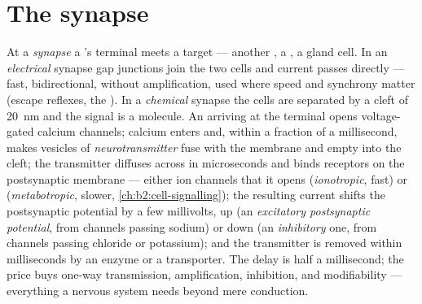 \section{The synapse}

\begin{definition}\label{def:b2:neurons-synapses:synapse}
At a \emph{synapse} a 's terminal meets a target --- another
, a , a gland cell. In an \emph{electrical}
synapse gap junctions join the two cells and current passes directly
--- fast, bidirectional, without amplification, used where speed and
synchrony matter (escape reflexes, the ). In a \emph{chemical}
synapse the cells are separated by a cleft of \qty{20}{nm} and the
signal is a molecule. An  arriving at the terminal
opens voltage-gated calcium channels; calcium enters and, within a
fraction of a millisecond, makes vesicles of \emph{neurotransmitter}
fuse with the membrane and empty into the cleft; the transmitter
diffuses across in microseconds and binds receptors on the
postsynaptic membrane --- either ion channels that it opens
(\emph{ionotropic}, fast) or 
(\emph{metabotropic}, slower, \cref{ch:b2:cell-signalling}); the
resulting current shifts the postsynaptic potential by a few
millivolts, up (an \emph{excitatory postsynaptic potential}, from
channels passing sodium) or down (an \emph{inhibitory} one, from
channels passing chloride or potassium); and the transmitter is
removed within milliseconds by an enzyme or a transporter. The
delay is half a millisecond; the price buys one-way transmission,
amplification, inhibition, and modifiability --- everything a
nervous system needs beyond mere conduction.
\end{definition}

